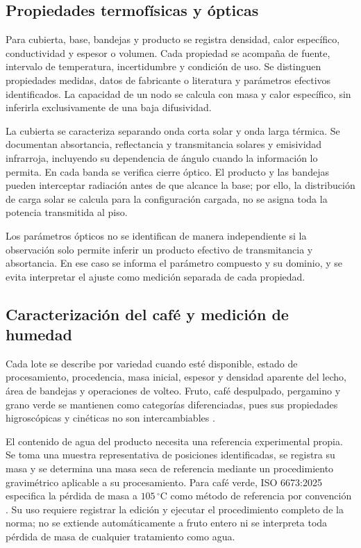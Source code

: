 \subsection{Propiedades termofísicas y ópticas}

Para cubierta, base, bandejas y producto se registra densidad, calor específico, conductividad y espesor o volumen. Cada propiedad se acompaña de fuente, intervalo de temperatura, incertidumbre y condición de uso. Se distinguen propiedades medidas, datos de fabricante o literatura y parámetros efectivos identificados. La capacidad de un nodo se calcula con masa y calor específico, sin inferirla exclusivamente de una baja difusividad.

La cubierta se caracteriza separando onda corta solar y onda larga térmica. Se documentan absortancia, reflectancia y transmitancia solares y emisividad infrarroja, incluyendo su dependencia de ángulo cuando la información lo permita. En cada banda se verifica cierre óptico. El producto y las bandejas pueden interceptar radiación antes de que alcance la base; por ello, la distribución de carga solar se calcula para la configuración cargada, no se asigna toda la potencia transmitida al piso.

Los parámetros ópticos no se identifican de manera independiente si la observación solo permite inferir un producto efectivo de transmitancia y absortancia. En ese caso se informa el parámetro compuesto y su dominio, y se evita interpretar el ajuste como medición separada de cada propiedad.

\subsection{Caracterización del café y medición de humedad}
\label{met:humedad_producto}

Cada lote se describe por variedad cuando esté disponible, estado de procesamiento, procedencia, masa inicial, espesor y densidad aparente del lecho, área de bandejas y operaciones de volteo. Fruto, café despulpado, pergamino y grano verde se mantienen como categorías diferenciadas, pues sus propiedades higroscópicas y cinéticas no son intercambiables \cite{correa2010,alves2017}.

El contenido de agua del producto necesita una referencia experimental propia. Se toma una muestra representativa de posiciones identificadas, se registra su masa y se determina una masa seca de referencia mediante un procedimiento gravimétrico aplicable a su procesamiento. Para café verde, ISO 6673:2025 especifica la pérdida de masa a $105\,^{\circ}\mathrm C$ como método de referencia por convención \cite{iso6673_2025}. Su uso requiere registrar la edición y ejecutar el procedimiento completo de la norma; no se extiende automáticamente a fruto entero ni se interpreta toda pérdida de masa de cualquier tratamiento como agua.

